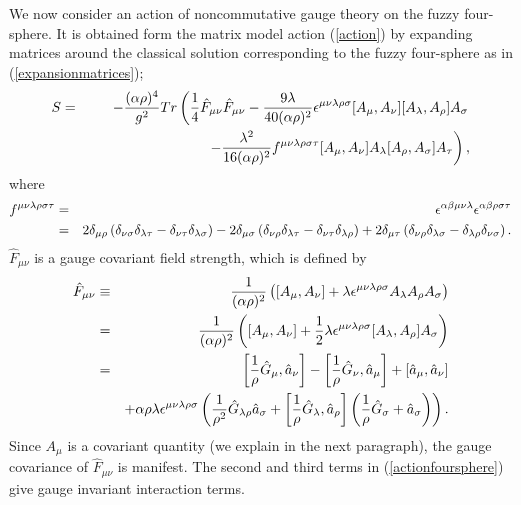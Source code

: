 \documentclass[a4paper,11pt]{article}
\begin{document}
We now consider an action of 
noncommutative gauge theory on the fuzzy four-sphere. 
It is obtained form the matrix model action (\ref{action}) 
by expanding matrices around the classical solution
corresponding to the fuzzy four-sphere as in 
(\ref{expansionmatrices}); 
\begin{eqnarray}
S&=&-\frac{(\alpha\rho)^{4}}{g^{2}}Tr\left(
\frac{1}{4}\hat{F}_{\mu\nu}\hat{F}_{\mu\nu}
-\frac{9\lambda}{40(\alpha\rho)^{2}}
\epsilon^{\mu\nu\lambda\rho\sigma}
[A_{\mu},A_{\nu}][A_{\lambda},A_{\rho}]A_{\sigma} \right. \cr 
&&\left. \hspace{3cm}
-\frac{\lambda^{2}}{16(\alpha\rho)^{2}}
f^{\mu\nu\lambda\rho\sigma\tau}
[A_{\mu},A_{\nu}]A_{\lambda}[A_{\rho},A_{\sigma}]A_{\tau}
\right), 
\label{actionfoursphere}
\end{eqnarray} 
where 
\begin{eqnarray}
f^{\mu\nu\lambda\rho\sigma\tau}&=&
\epsilon^{\alpha\beta\mu\nu\lambda}
\epsilon^{\alpha\beta\rho\sigma\tau} \cr
&=&2\delta_{\mu\rho}\left(\delta_{\nu\sigma}\delta_{\lambda\tau}
-\delta_{\nu\tau}\delta_{\lambda\sigma}\right)
-2\delta_{\mu\sigma}\left(\delta_{\nu\rho}\delta_{\lambda\tau}
-\delta_{\nu\tau}\delta_{\lambda\rho}\right)
+2\delta_{\mu\tau}\left(\delta_{\nu\rho}\delta_{\lambda\sigma}
-\delta_{\lambda\rho}\delta_{\nu\sigma}\right). 
\end{eqnarray} 
$\hat{F}_{\mu\nu}$ is a gauge covariant field strength, 
which is defined by 
\begin{eqnarray}
\hat{F}_{\mu\nu}&\equiv& \frac{1}{(\alpha\rho)^{2}}
\left( [A_{\mu},A_{\nu}]
+\lambda\epsilon^{\mu\nu\lambda\rho\sigma}
A_{\lambda}A_{\rho}A_{\sigma} \right)\cr 
&=&\frac{1}{(\alpha\rho)^{2}}\left( 
[A_{\mu},A_{\nu}]+\frac{1}{2}
\lambda\epsilon^{\mu\nu\lambda\rho\sigma}
[A_{\lambda},A_{\rho}]A_{\sigma}\right) \cr 
&=&
\left[\frac{1}{\rho}\hat{G}_{\mu},\hat{a}_{\nu}\right]
-\left[\frac{1}{\rho}\hat{G}_{\nu},\hat{a}_{\mu}\right]
+[\hat{a}_{\mu},\hat{a}_{\nu}] \cr 
&&+\alpha\rho
\lambda\epsilon^{\mu\nu\lambda\rho\sigma}
\left(
\frac{1}{\rho^{2}}\hat{G}_{\lambda\rho}\hat{a}_{\sigma}
+\left[\frac{1}{\rho}\hat{G}_{\lambda},\hat{a}_{\rho}\right]
\left(\frac{1}{\rho}\hat{G}_{\sigma}+\hat{a}_{\sigma}\right)
\right). 
\label{fieldstrength}
\end{eqnarray}
Since $A_{\mu}$ is a covariant quantity
(we explain in the next paragraph), 
the gauge covariance of $\hat{F}_{\mu\nu}$ is manifest. 
The second and third terms in 
(\ref{actionfoursphere}) 
give gauge invariant interaction terms. 
\end{document}
